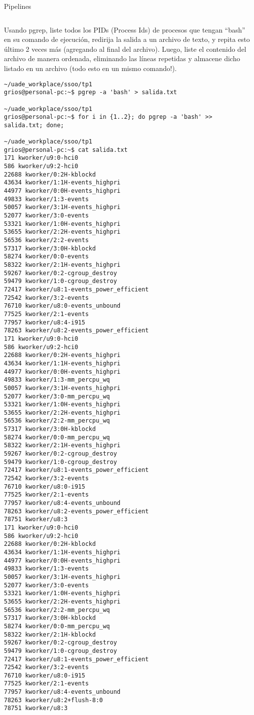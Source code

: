 \begin{section}{Pipelines}
\begin{lstlisting}[style=Ubuntu]
\end{lstlisting}

\begin{quoting}
Usando pgrep, liste todos los PIDs (Process Ids) de procesos que tengan “bash” en su comando de
ejecución, redirija la salida a un archivo de texto, y repita esto último 2 veces más (agregando al final del
archivo). Luego, liste el contenido del archivo de manera ordenada, eliminando las líneas repetidas y
almacene dicho listado en un archivo (todo esto en un mismo comando!).
\end{quoting}
\begin{lstlisting}[style=Ubuntu]
~/uade_workplace/ssoo/tp1
grios@personal-pc:~$ pgrep -a 'bash' > salida.txt 

~/uade_workplace/ssoo/tp1
grios@personal-pc:~$ for i in {1..2}; do pgrep -a 'bash' >> salida.txt; done;

~/uade_workplace/ssoo/tp1
grios@personal-pc:~$ cat salida.txt
171 kworker/u9:0-hci0
586 kworker/u9:2-hci0
22688 kworker/0:2H-kblockd
43634 kworker/1:1H-events_highpri
44977 kworker/0:0H-events_highpri
49833 kworker/1:3-events
50057 kworker/3:1H-events_highpri
52077 kworker/3:0-events
53321 kworker/1:0H-events_highpri
53655 kworker/2:2H-events_highpri
56536 kworker/2:2-events
57317 kworker/3:0H-kblockd
58274 kworker/0:0-events
58322 kworker/2:1H-events_highpri
59267 kworker/0:2-cgroup_destroy
59479 kworker/1:0-cgroup_destroy
72417 kworker/u8:1-events_power_efficient
72542 kworker/3:2-events
76710 kworker/u8:0-events_unbound
77525 kworker/2:1-events
77957 kworker/u8:4-i915
78263 kworker/u8:2-events_power_efficient
171 kworker/u9:0-hci0
586 kworker/u9:2-hci0
22688 kworker/0:2H-events_highpri
43634 kworker/1:1H-events_highpri
44977 kworker/0:0H-events_highpri
49833 kworker/1:3-mm_percpu_wq
50057 kworker/3:1H-events_highpri
52077 kworker/3:0-mm_percpu_wq
53321 kworker/1:0H-events_highpri
53655 kworker/2:2H-events_highpri
56536 kworker/2:2-mm_percpu_wq
57317 kworker/3:0H-kblockd
58274 kworker/0:0-mm_percpu_wq
58322 kworker/2:1H-events_highpri
59267 kworker/0:2-cgroup_destroy
59479 kworker/1:0-cgroup_destroy
72417 kworker/u8:1-events_power_efficient
72542 kworker/3:2-events
76710 kworker/u8:0-i915
77525 kworker/2:1-events
77957 kworker/u8:4-events_unbound
78263 kworker/u8:2-events_power_efficient
78751 kworker/u8:3
171 kworker/u9:0-hci0
586 kworker/u9:2-hci0
22688 kworker/0:2H-kblockd
43634 kworker/1:1H-events_highpri
44977 kworker/0:0H-events_highpri
49833 kworker/1:3-events
50057 kworker/3:1H-events_highpri
52077 kworker/3:0-events
53321 kworker/1:0H-events_highpri
53655 kworker/2:2H-events_highpri
56536 kworker/2:2-mm_percpu_wq
57317 kworker/3:0H-kblockd
58274 kworker/0:0-mm_percpu_wq
58322 kworker/2:1H-kblockd
59267 kworker/0:2-cgroup_destroy
59479 kworker/1:0-cgroup_destroy
72417 kworker/u8:1-events_power_efficient
72542 kworker/3:2-events
76710 kworker/u8:0-i915
77525 kworker/2:1-events
77957 kworker/u8:4-events_unbound
78263 kworker/u8:2+flush-8:0
78751 kworker/u8:3


\end{lstlisting}
\end{section}
